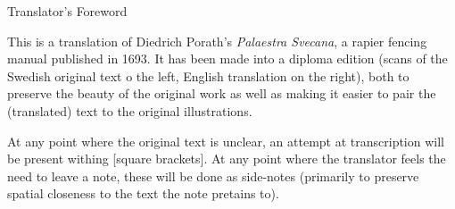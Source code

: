 {\large Translator's Foreword}

This is a translation of Diedrich Porath's {\it Palaestra Svecana}, a rapier fencing manual published in 1693. It has been made into a diploma edition (scans of the Swedish original text o the left, English translation on the right), both to preserve the beauty of the original work as well as making it easier to pair the (translated) text to the original illustrations.

At any point where the original text is unclear, an attempt at transcription will be present withing [square brackets]. At any point where the translator feels the need to leave a note, these will be done as side-notes (primarily to preserve spatial closeness to the text the note pretains to).